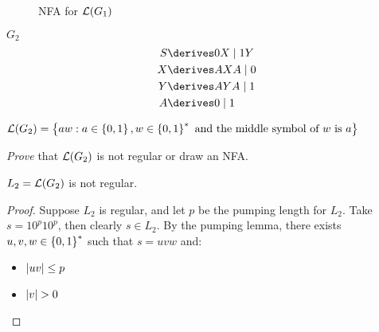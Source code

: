 \begin{problem}
\begin{enumalph}
\begin{Answer}
\begin{enumroman}
\begin{figure}[H]
            \caption{NFA for $\mathcal{L}(G_1)$}
          \end{figure}
        \end{enumroman}
      \end{Answer}
    \newpage
    \item $G_2$
      \begin{align*}
        S &\derives 0X \mid 1Y \\
        X &\derives AXA \mid 0 \\
        Y &\derives AYA \mid 1 \\
        A &\derives 0 \mid 1
      \end{align*}
      \begin{Answer}
        \begin{enumroman}
          \item $\mathcal{L}(G_2) = \left\{aw : a \in \left\{0, 1\right\}, w \in \left\{0, 1\right\}^*
            \text{ and the middle symbol of $w$ is $a$}\right\}$
          \item \emph{Prove} that $\mathcal{L}(G_2)$ is not regular or draw an NFA.

            \step
            \begin{claim}
              $L_2 = \mathcal{L}(G_2)$ is not regular.

              \begin{proof}
                Suppose $L_2$ is regular,
                and let $p$ be the pumping length for $L_2$.
                Take $s = 10^p10^p$, then clearly $s \in L_2$.
                By the pumping lemma, there exists $u, v, w \in \left\{0, 1\right\}^*$ such that
                $s = uvw$ and:
                \begin{itemize}
                  \item $\lvert uv\rvert \leq p$
                  \item $\lvert v\rvert > 0$
                  

\end{itemize}
\end{proof}
\end{claim}
\end{enumroman}
\end{Answer}
\end{enumalph}
\end{problem}
